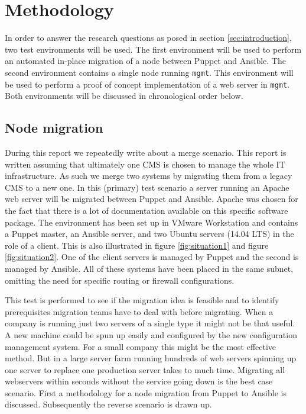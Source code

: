 \section{Methodology}\label{sec:methodology}
In order to answer the research questions as posed in section \ref{sec:introduction}, two test environments will be used. The first environment will be used to perform an automated in-place migration of a node between Puppet and Ansible. The second environment contains a single node running \texttt{mgmt}. This environment will be used to perform a proof of concept implementation of a web server in \texttt{mgmt}. Both environments will be discussed in chronological order below. 

\subsection{Node migration}
During this report we repeatedly write about a merge scenario. This report is written assuming that ultimately one CMS is chosen to manage the whole IT infrastructure. As such we merge two systems by migrating them from a legacy CMS to a new one. In this (primary) test scenario a server running an Apache web server will be migrated between Puppet and Ansible. Apache was chosen for the fact that there is a lot of documentation available on this specific software package. The environment has been set up in VMware Workstation and contains a Puppet master, an Ansible server, and two Ubuntu servers (14.04 LTS) in the role of a client. This is also illustrated in figure \ref{fig:situation1} and figure \ref{fig:situation2}. One of the client servers is managed by Puppet and the second is managed by Ansible. All of these systems have been placed in the same subnet, omitting the need for specific routing or firewall configurations. 

This test is performed to see if the migration idea is feasible and to identify prerequisites migration teams have to deal with before migrating. When a company is running just two servers of a single type it might not be that useful. A new machine could be spun up easily and configured by the new configuration management system. For a small company this might be the most effective method. But in a large server farm running hundreds of web servers spinning up one server to replace one production server takes to much time. Migrating all webservers within seconds without the service going down is the best case scenario. First a methodology for a node migration from Puppet to Ansible is discussed. Subsequently the reverse scenario is drawn up. 

